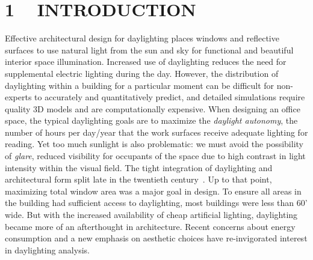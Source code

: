 \documentclass{article}
\begin{document}
\section{1 ~ INTRODUCTION}
Effective architectural design for daylighting places windows and
reflective surfaces to use natural light from the sun and sky for
functional and beautiful interior space illumination.  Increased use
of daylighting reduces the need for supplemental electric lighting
during the day.  However, the distribution of daylighting within a
building for a particular moment can be difficult for non-experts to
accurately and quantitatively predict, and detailed simulations
require quality 3D models and are computationally expensive.  When
designing an office space, the typical daylighting goals are to
maximize the {\em daylight autonomy}, the number of hours per day/year
that the work surfaces receive adequate lighting for reading.  Yet too
much sunlight is also problematic: we must avoid the possibility of
{\em glare}, reduced visibility for occupants of the space due to high
contrast in light intensity within the visual field.
%
The tight integration of daylighting and architectural form split late
in the twentieth century~\cite{lechner2001heating}.  Up to that point,
maximizing total window area was a major goal in design.  To ensure
all areas in the building had sufficient access to daylighting, most
buildings were less than 60' wide.  But with the increased
availability of cheap artificial lighting, daylighting became more of
an afterthought in architecture.  Recent concerns about energy
consumption and a new emphasis on aesthetic choices have
re-invigorated interest in daylighting analysis.
\end{document}
